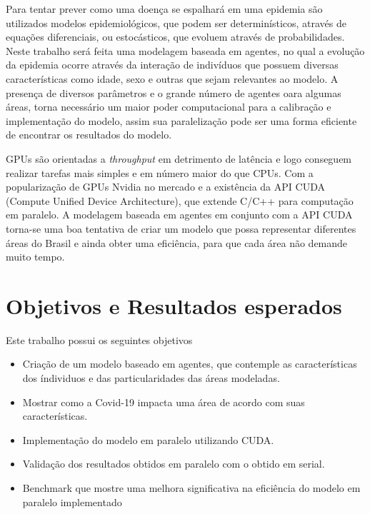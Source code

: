 \documentclass[
	12pt,				%
	openright,			%
	oneside,			%
	a4paper,			%
	english,			%
	french,				%
	spanish,			%
	brazil				%
	]{abntex2}
\begin{document}
Para tentar prever como uma doença se espalhará em uma epidemia são utilizados modelos epidemiológicos, que podem ser determinísticos, através de equações diferenciais, ou estocásticos, que evoluem através de probabilidades. Neste trabalho será feita uma modelagem baseada em agentes, no qual a evolução da epidemia ocorre através da interação de indivíduos que possuem diversas características como idade, sexo e outras que sejam relevantes ao modelo. A presença de diversos parâmetros e o grande número de agentes oara algumas áreas, torna necessário um maior poder computacional para a calibração e implementação do modelo, assim sua paralelização pode ser uma forma eficiente de encontrar os resultados do modelo.

GPUs são orientadas a \textit{throughput} em detrimento de latência e logo conseguem realizar tarefas mais simples e em número maior do que CPUs. Com a popularização de GPUs Nvidia no mercado e a existência da API CUDA (Compute Unified Device Architecture), que extende C/C++ para computação em paralelo. A modelagem baseada em agentes em conjunto com a API CUDA torna-se uma boa tentativa de criar um modelo que possa representar diferentes áreas do Brasil e ainda obter uma eficiência, para que cada área não demande muito tempo.









\chapter{Objetivos e Resultados esperados}

Este trabalho possui os seguintes objetivos

\begin{itemize}
    \item Criação de um modelo baseado em agentes, que contemple as características dos índividuos e das particularidades das áreas modeladas.

    \item Mostrar como a Covid-19 impacta uma área de acordo com suas características.

    \item Implementação do modelo em paralelo utilizando CUDA.

    \item Validação dos resultados obtidos em paralelo com o obtido em serial.

    \item Benchmark que mostre uma melhora significativa na eficiência do modelo em paralelo implementado
\end{itemize}
\end{document}
